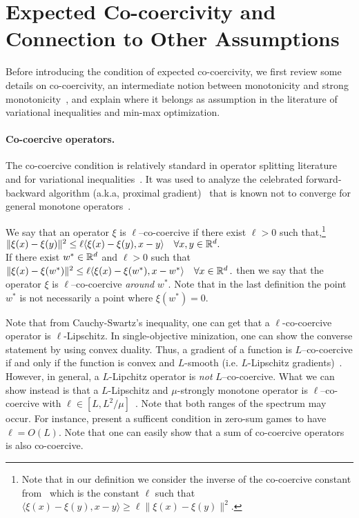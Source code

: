 \documentclass{article}
\begin{document}
\section{Expected Co-coercivity and Connection to Other Assumptions}
\label{Section_ExpectedCoCo}
Before introducing the condition of expected co-coercivity, we first review some details on co-coercivity, an intermediate notion between monotonicity and strong monotonicity~\citep{zhu1996co}, and explain where it belongs as assumption in the literature of variational inequalities and min-max optimization.
\paragraph{Co-coercive operators.} The co-coercive condition is relatively standard in operator splitting literature~\citep{davis2017three,vu2013splitting} and for variational inequalities~\citep{zhu1996co}. It was used to analyze the celebrated forward-backward algorithm (a.k.a, proximal gradient)~\citep{lions1979splitting,chen1997convergence,palaniappan2016stochastic} that is known not to converge for general monotone operators~\citep{bauschke2011convex}.
\begin{definition} \label{def:cocoercivity}
We say that an operator $\xi$ is $\ell$--co-coercive if there exist $\ell>0$ such that,\footnote{Note that in our definition we consider the inverse of the co-coercive constant from~\citet{lions1979splitting} which is the constant $\ell$ such that $\langle\xi(x)-\xi(y),x-y\rangle \geq \ell \|\xi(x)-\xi(y)\|^2 .$}
$\|\xi(x)-\xi(y)\|^2 \leq \ell \langle\xi(x)-\xi(y),x-y\rangle \quad \forall x , y \in \mathbb{R}^d.$ \\If there exist $w^* \in \mathbb{R}^d$ and $\ell>0$ such that $\|\xi(x)-\xi(w^*)\|^2 \leq \ell \langle\xi(x)-\xi(w^*),x-w^*\rangle \quad \forall x \in \mathbb{R}^d\,.$ then we say that the operator $\xi$ is $\ell$--co-coercive \emph{around} $w^*$. Note that in the last definition the point $w^*$ is not necessarily a point where $\xi(w^*)=0$.
\end{definition}
\vspace{-2mm}
Note that from Cauchy-Swartz's inequality, one can get that a $\ell$-co-coercive operator is $\ell$-Lipschitz.
In single-objective minization, one can show the converse statement by using convex duality. Thus, a gradient of a function is $L$--co-coercive if and only if the function is convex and $L$-smooth (i.e. $L$-Lipschitz gradients)~\citep{bauschke2011convex}. However, in general, a $L$-Lipchitz operator is \emph{not} $L$--co-coercive. What we can show instead is that  a $L$-Lipschitz and $\mu$-strongly monotone operator is $\ell$--co-coercive with $\ell \in [L, L^2/\mu]$~\citep{facchinei2007finite}. Note that both ranges of the spectrum may occur. For instance, \citet{chavdarova2019reducing} present a sufficent condition in zero-sum games to have $\ell = O(L)$.  Note that one can easily show that a sum of co-coercive operators is also co-coercive. 
\end{document}
